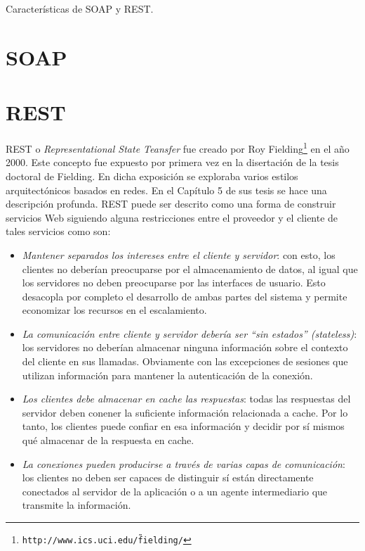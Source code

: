 \documentclass[conference]{IEEEtran}
\begin{document}
Características de SOAP y REST.

\lipsum[7]

\section{SOAP}
\label{sec:soap}

\lipsum[1]

\section{REST}
\label{sec:soap}

REST o \textsl{Representational State Teansfer} fue creado por Roy
Fielding\footnote{\texttt{http://www.ics.uci.edu/\~fielding/}} en el
año 2000. Este concepto fue expuesto por primera vez en la disertación
de la tesis doctoral de Fielding. En dicha exposición se exploraba
varios estilos arquitectónicos basados en redes. En el Capítulo 5
\cite{FieldingPhD} de sus tesis se hace una descripción profunda. REST
puede ser descrito como una forma de construir servicios Web siguiendo
alguna restricciones entre el proveedor y el cliente de tales
servicios como son\cite{NordicAPIs}:

\begin{itemize}
\item \emph{Mantener separados los intereses entre el cliente y
    servidor}:
  con esto, los clientes no deberían preocuparse por el almacenamiento
  de datos, al igual que los servidores no deben preocuparse por las
  interfaces de usuario. Esto desacopla por completo el desarrollo de
  ambas partes del sistema y permite economizar los recursos en el
  escalamiento. 
\item \emph{La comunicación entre cliente y servidor debería ser ``sin
  estados'' (\emph{stateless})}:  los servidores no deberían almacenar
  ninguna información sobre el contexto del cliente en sus
  llamadas. Obviamente con las excepciones de sesiones que utilizan
  información para mantener la autenticación de la conexión.
\item \emph{Los clientes debe almacenar en cache  las respuestas}:
  todas las
  respuestas del servidor deben conener la suficiente información
  relacionada a cache. Por lo tanto, los clientes puede confiar en esa
  información y decidir por sí mismos qué almacenar de la respuesta en
  cache. 
\item \emph{La conexiones pueden producirse  a través de varias capas de
  comunicación}: los clientes no deben ser capaces de distinguir sí
  están directamente conectados al servidor de la aplicación o a un
  agente intermediario que transmite la información. 
\end{itemize}
\end{document}
